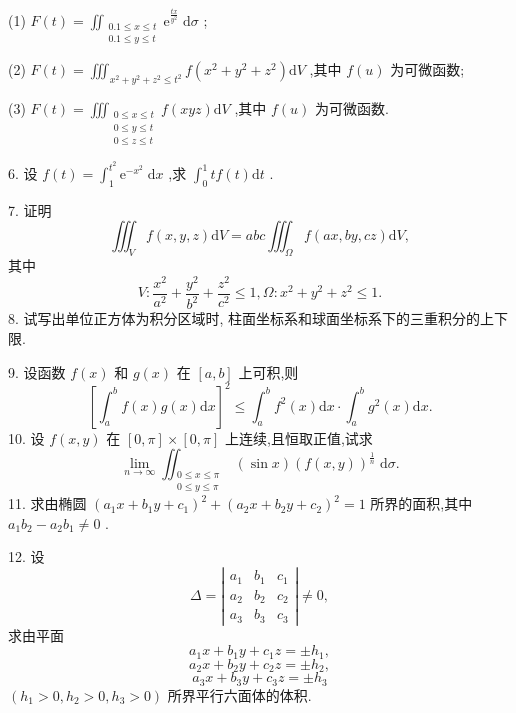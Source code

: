 (1) \(F\left( t\right)  = {\iint }_{\begin{matrix} {{0.1} \leq  x \leq  t} \\  {{0.1} \leq  y \leq  t} \end{matrix}}{\mathrm{e}}^{\frac{tx}{{y}^{2}}}\mathrm{\;d}\sigma\) ;

(2) \(F\left( t\right)  = {\iiint }_{{x}^{2} + {y}^{2} + {z}^{2} \leq  {t}^{2}}f\left( {{x}^{2} + {y}^{2} + {z}^{2}}\right) \mathrm{d}V\) ,其中 \(f\left( u\right)\) 为可微函数;

(3) \(F\left( t\right)  = {\iiint }_{\begin{matrix} {0 \leq  x \leq  t} \\  {0 \leq  y \leq  t} \\  {0 \leq  z \leq  t} \end{matrix}}f\left( {xyz}\right) \mathrm{d}V\) ,其中 \(f\left( u\right)\) 为可微函数.

6. 设 \(f\left( t\right)  = {\int }_{1}^{{t}^{2}}{\mathrm{e}}^{-{x}^{2}}\mathrm{\;d}x\) ,求 \({\int }_{0}^{1}{tf}\left( t\right) \mathrm{d}t\) .

7. 证明
\[
{\iiint }_{V}f\left( {x,y,z}\right) \mathrm{d}V = {abc}{\iiint }_{\Omega }f\left( {{ax},{by},{cz}}\right) \mathrm{d}V,
\]
其中
\[
V : \frac{{x}^{2}}{{a}^{2}} + \frac{{y}^{2}}{{b}^{2}} + \frac{{z}^{2}}{{c}^{2}} \leq  1,\Omega  : {x}^{2} + {y}^{2} + {z}^{2} \leq  1.
\]
8. 试写出单位正方体为积分区域时, 柱面坐标系和球面坐标系下的三重积分的上下限.

9. 设函数 \(f\left( x\right)\) 和 \(g\left( x\right)\) 在 \(\left\lbrack  {a,b}\right\rbrack\) 上可积,则
\[
{\left\lbrack  {\int }_{a}^{b}f\left( x\right) g\left( x\right) \mathrm{d}x\right\rbrack  }^{2} \leq  {\int }_{a}^{b}{f}^{2}\left( x\right) \mathrm{d}x \cdot  {\int }_{a}^{b}{g}^{2}\left( x\right) \mathrm{d}x.
\]
10. 设 \(f\left( {x,y}\right)\) 在 \(\left\lbrack  {0,\pi }\right\rbrack   \times  \left\lbrack  {0,\pi }\right\rbrack\) 上连续,且恒取正值,试求
\[
\mathop{\lim }\limits_{{n \rightarrow  \infty }}{\iint }_{\begin{matrix} {0 \leq  x \leq  \pi } \\  {0 \leq  y \leq  \pi } \end{matrix}}\left( {\sin x}\right) {\left( f\left( x,y\right) \right) }^{\frac{1}{n}}\mathrm{\;d}\sigma .
\]
11. 求由椭圆 \({\left( {a}_{1}x + {b}_{1}y + {c}_{1}\right) }^{2} + {\left( {a}_{2}x + {b}_{2}y + {c}_{2}\right) }^{2} = 1\) 所界的面积,其中 \({a}_{1}{b}_{2} - {a}_{2}{b}_{1} \neq  0\) .

12. 设
\[
\Delta  = \left| \begin{array}{lll} {a}_{1} & {b}_{1} & {c}_{1} \\  {a}_{2} & {b}_{2} & {c}_{2} \\  {a}_{3} & {b}_{3} & {c}_{3} \end{array}\right|  \neq  0,
\]
求由平面
\[
{a}_{1}x + {b}_{1}y + {c}_{1}z =  \pm  {h}_{1},
\]
\[
{a}_{2}x + {b}_{2}y + {c}_{2}z =  \pm  {h}_{2},
\]
\[
{a}_{3}x + {b}_{3}y + {c}_{3}z =  \pm  {h}_{3}
\]
\(\left( {{h}_{1} > 0,{h}_{2} > 0,{h}_{3} > 0}\right)\) 所界平行六面体的体积.

